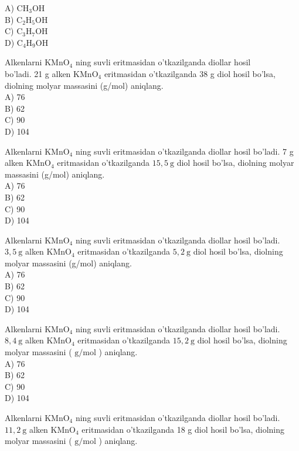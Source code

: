 A) $\mathrm{CH}_{3} \mathrm{OH}$\\
B) $\mathrm{C}_{2} \mathrm{H}_{5} \mathrm{OH}$\\
C) $\mathrm{C}_{3} \mathrm{H}_{7} \mathrm{OH}$\\
D) $\mathrm{C}_{4} \mathrm{H}_{9} \mathrm{OH}$
  \item Alkenlarni $\mathrm{KMnO}_{4}$ ning suvli eritmasidan o'tkazilganda diollar hosil\\
bo'ladi. 21 g alken $\mathrm{KMnO}_{4}$ eritmasidan o'tkazilganda 38 g diol hosil bo'lsa, diolning molyar massasini (g/mol) aniqlang.\\
A) 76\\
B) 62\\
C) 90\\
D) 104
  \item Alkenlarni $\mathrm{KMnO}_{4}$ ning suvli eritmasidan o'tkazilganda diollar hosil bo'ladi. 7 g alken $\mathrm{KMnO}_{4}$ eritmasidan o'tkazilganda $15,5 \mathrm{~g}$ diol hosil bo'lsa, diolning molyar massasini (g/mol) aniqlang.\\
A) 76\\
B) 62\\
C) 90\\
D) 104
  \item Alkenlarni $\mathrm{KMnO}_{4}$ ning suvli eritmasidan o'tkazilganda diollar hosil bo'ladi. $3,5 \mathrm{~g}$ alken $\mathrm{KMnO}_{4}$ eritmasidan o'tkazilganda $5,2 \mathrm{~g}$ diol hosil bo'lsa, diolning molyar massasini (g/mol) aniqlang.\\
A) 76\\
B) 62\\
C) 90\\
D) 104
  \item Alkenlarni $\mathrm{KMnO}_{4}$ ning suvli eritmasidan o'tkazilganda diollar hosil bo'ladi. $8,4 \mathrm{~g}$ alken $\mathrm{KMnO}_{4}$ eritmasidan o'tkazilganda $15,2 \mathrm{~g}$ diol hosil bo'lsa, diolning molyar massasini ( $\mathrm{g} / \mathrm{mol}$ ) aniqlang.\\
A) 76\\
B) 62\\
C) 90\\
D) 104
  \item Alkenlarni $\mathrm{KMnO}_{4}$ ning suvli eritmasidan o'tkazilganda diollar hosil bo'ladi. $11,2 \mathrm{~g}$ alken $\mathrm{KMnO}_{4}$ eritmasidan o'tkazilganda 18 g diol hosil bo'lsa, diolning molyar massasini ( $\mathrm{g} / \mathrm{mol}$ ) aniqlang.\\
